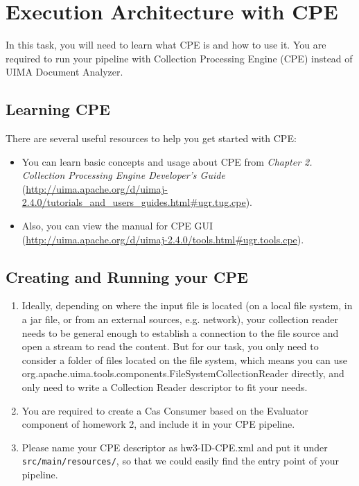 
\chapter{Execution Architecture with CPE}


In this task, you will need to learn what CPE is and how to use it.
You are required to run your pipeline with Collection Processing Engine (CPE) instead of UIMA Document Analyzer. 

\section{Learning CPE}

There are several useful resources to help you get started with CPE:
\begin{itemize}
  \item You can learn basic concepts and usage about CPE from 
				\emph{Chapter 2. Collection Processing Engine Developer's Guide} 
				(\url{http://uima.apache.org/d/uimaj-2.4.0/tutorials_and_users_guides.html#ugr.tug.cpe}). 
	   \item Also, you can view the manual for CPE GUI 
	   (\url{http://uima.apache.org/d/uimaj-2.4.0/tools.html#ugr.tools.cpe}).
\end{itemize}

\section{Creating and Running your CPE}

\begin{enumerate}

\item Ideally, depending on where the input file is located (on a local file
system, in a jar file, or from an external sources, e.g. network), your
collection reader needs to be general enough to establish a connection to the
file source and open a stream to read the content. But for our task, you only
need to consider a folder of files located on the file system, which means 
you can use org.apache.uima.tools.components.FileSystemCollectionReader directly, 
and only need to write a Collection Reader descriptor to fit your needs.  

\item You are required to create a Cas Consumer based on the Evaluator component of homework 2, 
and include it in your CPE pipeline.

\item Please name your CPE descriptor as hw3-ID-CPE.xml and put it
under \texttt{src/main/resources/}, so that we could easily find the entry point
of your pipeline.

 
\end{enumerate}